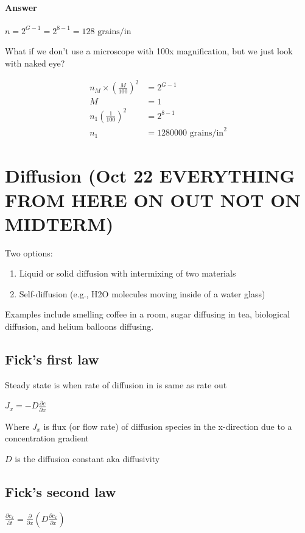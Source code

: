 \documentclass{article}
\begin{document}
\paragraph{Answer} $n = 2^{G-1} = 2^{8-1} = 128 \text{ grains/in}$

What if we don't use a microscope with 100x magnification, but we just look with naked eye?

\begin{align*}
    n_M \times \left(\frac{M}{100}\right)^2 &= 2^{G-1}\\
    M &= 1\\
    n_1\left(\frac{1}{100}\right)^2 &= 2^{8-1}\\
    n_1 &= 1280000 \text{ grains/in}^2
\end{align*}

\section{Diffusion (Oct 22 EVERYTHING FROM HERE ON OUT NOT ON MIDTERM)}

Two options:
\begin{enumerate}
    \item Liquid or solid diffusion with intermixing of two materials
    \item Self-diffusion (e.g., H2O molecules moving inside of a water glass)
\end{enumerate}

Examples include smelling coffee in a room, sugar diffusing in tea, biological diffusion, and helium balloons diffusing.

\subsection{Fick's first law}

Steady state is when rate of diffusion in is same as rate out

$J_x = -D\frac{\partial c}{\partial x}$

Where $J_x$ is flux (or flow rate) of diffusion species in the x-direction due to a concentration gradient

$D$ is the diffusion constant aka diffusivity

\subsection{Fick's second law}

$\frac{\partial c_x}{\partial t} = \frac{\partial }{\partial x}\left(D\frac{\partial c_x}{\partial x}\right)$
\end{document}
